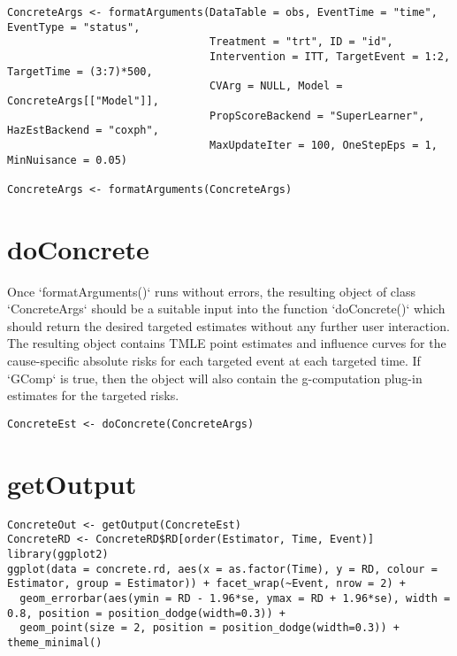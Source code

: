 \documentclass{report}
\newcommand{\1}{\ensuremath{\mathbf{1}}}
\begin{document}
\begin{lstlisting}
ConcreteArgs <- formatArguments(DataTable = obs, EventTime = "time", EventType = "status", 
                                Treatment = "trt", ID = "id", 
                                Intervention = ITT, TargetEvent = 1:2, TargetTime = (3:7)*500, 
                                CVArg = NULL, Model = ConcreteArgs[["Model"]], 
                                PropScoreBackend = "SuperLearner", HazEstBackend = "coxph", 
                                MaxUpdateIter = 100, OneStepEps = 1, MinNuisance = 0.05)

ConcreteArgs <- formatArguments(ConcreteArgs)
\end{lstlisting}

\section{doConcrete}
Once `formatArguments()` runs without errors, the resulting object of class `ConcreteArgs` should be a suitable input into the function `doConcrete()` which should return the desired targeted estimates without any further user interaction. The resulting object contains TMLE point estimates and influence curves for the cause-specific absolute risks for each targeted event at each targeted time. If `GComp` is true, then the object will also contain the g-computation plug-in estimates for the targeted risks.

\begin{lstlisting}
ConcreteEst <- doConcrete(ConcreteArgs)
\end{lstlisting}

\section{getOutput}
\begin{lstlisting}
ConcreteOut <- getOutput(ConcreteEst)
ConcreteRD <- ConcreteRD$RD[order(Estimator, Time, Event)]
library(ggplot2)
ggplot(data = concrete.rd, aes(x = as.factor(Time), y = RD, colour = Estimator, group = Estimator)) + facet_wrap(~Event, nrow = 2) + 
  geom_errorbar(aes(ymin = RD - 1.96*se, ymax = RD + 1.96*se), width = 0.8, position = position_dodge(width=0.3)) +
  geom_point(size = 2, position = position_dodge(width=0.3)) + theme_minimal()
\end{lstlisting}
\end{document}
